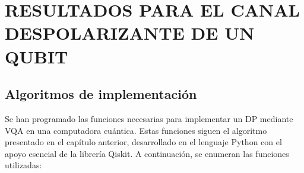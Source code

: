 \documentclass[letterpaper,12pt]{thesisECFM}
\theoremstyle{plain}
\theoremstyle{definition}
\theoremstyle{definition}
\theoremstyle{remark}
\newcommand{\1}{\mathbb{1}}
\begin{document}
\chapter{RESULTADOS PARA EL CANAL DESPOLARIZANTE DE UN QUBIT } %
\section{Algoritmos de implementación} %
Se han programado las funciones necesarias para implementar un DP mediante VQA
en una computadora cuántica. Estas funciones siguen el algoritmo presentado en
el capítulo anterior, desarrollado en el lenguaje Python con el apoyo esencial
de la librería Qiskit. A continuación, se enumeran las funciones utilizadas: 
\end{document}
